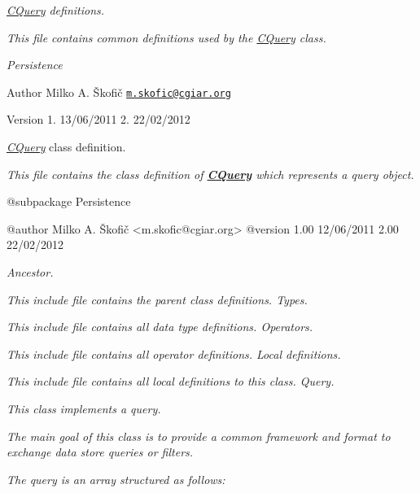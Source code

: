{\itshape \hyperlink{class_c_query}{C\-Query} definitions.}

{\itshape This file contains common definitions used by the \hyperlink{class_c_query}{C\-Query} class.}

{\itshape  Persistence}

{\itshape \begin{DoxyAuthor}{Author}
Milko A. Škofič \href{mailto:m.skofic@cgiar.org}{\tt m.\-skofic@cgiar.\-org} 
\end{DoxyAuthor}
\begin{DoxyVersion}{Version}
1. 13/06/2011 2. 22/02/2012
\end{DoxyVersion}
{\itshape \hyperlink{class_c_query}{C\-Query}} class definition.}

{\itshape This file contains the class definition of {\bfseries \hyperlink{class_c_query}{C\-Query}} which represents a query object.}

{\itshape \begin{DoxyVerb} @subpackage        Persistence

 @author            Milko A. Škofič <m.skofic@cgiar.org>
 @version   1.00 12/06/2011
                            2.00 22/02/2012\end{DoxyVerb}
}

{\itshape Ancestor.}

{\itshape This include file contains the parent class definitions. Types.}

{\itshape This include file contains all data type definitions. Operators.}

{\itshape This include file contains all operator definitions. Local definitions.}

{\itshape This include file contains all local definitions to this class. Query.}

{\itshape This class implements a query.}

{\itshape The main goal of this class is to provide a common framework and format to exchange data store queries or filters.}

{\itshape The query is an array structured as follows\-:}

